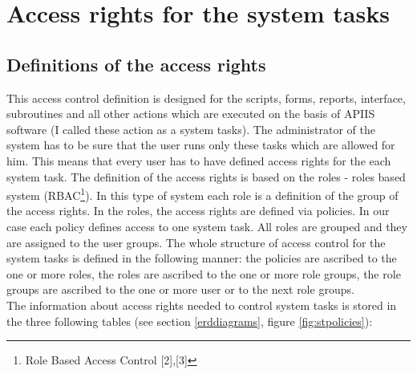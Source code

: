 

\section{Access rights for the system tasks \label{acfst}} 
\subsection{Definitions of the access rights \label{definitionarST}} 

This access control definition is designed for the scripts, forms, reports, interface, subroutines and all other actions which are executed on the basis of APIIS software (I called these action as a system tasks). The administrator of the system has to be sure that the user runs only these tasks which are allowed for him. This means that every user has to have defined access rights for the each system task. The definition of the access rights is based on the roles - roles based system (RBAC\footnote{Role Based Access Control [2],[3]}). In this type of system each role is a definition of the group of the access rights. In the roles, the access rights are defined via policies. In our case each policy defines access to one system task. All roles are grouped and they are assigned to the user groups. The whole structure of access control for the system tasks is defined in the following manner: the policies are ascribed to the one or more roles, the roles are ascribed to the one or more role groups, the role groups are ascribed to the one or more user or to the next role groups.\\
The information about access rights needed to control system tasks is stored in the three following tables (see section \ref{erddiagrams}, figure \ref{fig:stpolicies}):
